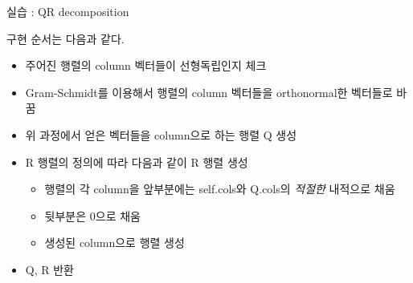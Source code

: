 \documentclass{beamer}
\begin{document}
\begin{frame}{실습 : QR decomposition}

구현 순서는 다음과 같다. 
\begin{itemize} 
\item 주어진 행렬의 column 벡터들이 선형독립인지 체크 
\item Gram-Schmidt를 이용해서 행렬의 column 벡터들을 orthonormal한 벡터들로 바꿈 
\item 위 과정에서 얻은 벡터들을 column으로 하는 행렬 Q 생성
\item R 행렬의 정의에 따라 다음과 같이 R 행렬 생성 
\begin{itemize} 
\item 행렬의 각 column을 앞부분에는 self.cols와 Q.cols의 \textit{적절한} 내적으로 채움 
\item 뒷부분은 0으로 채움 
\item 생성된 column으로 행렬 생성 
\end{itemize}
\item Q, R 반환
\end{itemize}
\end{frame}










\end{document}
